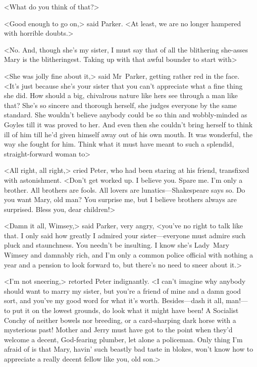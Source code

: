 <What do you think of that?>

<Good enough to go on,> said Parker. <At least, we are no longer hampered with horrible doubts.>

<No. And, though she's my sister, I must say that of all the blithering she-asses Mary is the blitheringest. Taking up with that awful bounder to start with\longdash>

<She was jolly fine about it,> said Mr~Parker, getting rather red in the face. <It's just because she's your sister that you can't appreciate what a fine thing she did. How should a big, chivalrous nature like hers see through a man like that? She's so sincere and thorough herself, she judges everyone by the same standard. She wouldn't believe anybody could be so thin and wobbly-minded as Goyles till it was proved to her. And even then she couldn't bring herself to think ill of him till he'd given himself away out of his own mouth. It was wonderful, the way she fought for him. Think what it must have meant to such a splendid, straight-forward woman to\longdash>

<All right, all right,> cried Peter, who had been staring at his friend, transfixed with astonishment. <Don't get worked up. I believe you. Spare me. I'm only a brother. All brothers are fools. All lovers are lunatics—Shakespeare says so. Do you want Mary, old man? You surprise me, but I believe brothers always are surprised. Bless you, dear children!>

<Damn it all, Wimsey,> said Parker, very angry, <you've no right to talk like that. I only said how greatly I admired your sister—everyone must admire such pluck and staunchness. You needn't be insulting. I know she's Lady~Mary Wimsey and damnably rich, and I'm only a common police official with nothing a year and a pension to look forward to, but there's no need to sneer about it.>

<I'm not sneering,> retorted Peter indignantly. <I can't imagine why anybody should want to marry my sister, but you're a friend of mine and a damn good sort, and you've my good word for what it's worth. Besides—dash it all, man!—to put it on the lowest grounds, do look what it might have been! A Socialist Conchy of neither bowels nor breeding, or a card-sharping dark horse with a mysterious past! Mother and Jerry must have got to the point when they'd welcome a decent, God-fearing plumber, let alone a policeman. Only thing I'm afraid of is that Mary, havin' such beastly bad taste in blokes, won't know how to appreciate a really decent fellow like you, old son.>

